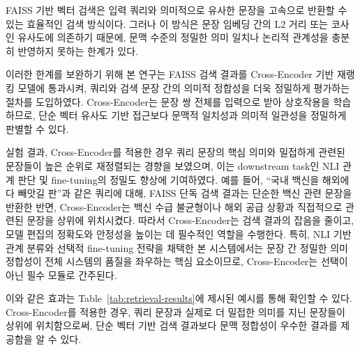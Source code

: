 \documentclass[a4paper,fleqn]{cas-sc}
\begin{document}
FAISS 기반 벡터 검색은 입력 쿼리와 의미적으로 유사한 문장을 고속으로 반환할 수 있는 효율적인 검색 방식이다. 
그러나 이 방식은 문장 임베딩 간의 L2 거리 또는 코사인 유사도에 의존하기 때문에, 문맥 수준의 정밀한 의미 일치나 논리적 관계성을 충분히 반영하지 못하는 한계가 있다.

이러한 한계를 보완하기 위해 본 연구는 FAISS 검색 결과를 Cross-Encoder 기반 재랭킹 모델에 통과시켜, 쿼리와 검색 문장 간의 의미적 정합성을 더욱 정밀하게 평가하는 절차를 도입하였다. 
Cross-Encoder는 문장 쌍 전체를 입력으로 받아 상호작용을 학습하므로, 단순 벡터 유사도 기반 접근보다 문맥적 일치성과 의미적 일관성을 정밀하게 판별할 수 있다.

실험 결과, Cross-Encoder를 적용한 경우 쿼리 문장의 핵심 의미와 밀접하게 관련된 문장들이 높은 순위로 재정렬되는 경향을 보였으며, 이는 downstream task인 NLI 관계 판단 및 fine-tuning의 정밀도 향상에 기여하였다. 예를 들어, “국내 백신을 해외에 다 빼앗길 판”과 같은 쿼리에 대해, FAISS 단독 검색 결과는 단순한 백신 관련 문장을 반환한 반면, Cross-Encoder는 백신 수급 불균형이나 해외 공급 상황과 직접적으로 관련된 문장을 상위에 위치시켰다.
따라서 Cross-Encoder는 검색 결과의 잡음을 줄이고, 모델 편집의 정확도와 안정성을 높이는 데 필수적인 역할을 수행한다. 
특히, NLI 기반 관계 분류와 선택적 fine-tuning 전략을 채택한 본 시스템에서는 문장 간 정밀한 의미 정합성이 전체 시스템의 품질을 좌우하는 핵심 요소이므로, Cross-Encoder는 선택이 아닌 필수 모듈로 간주된다.

이와 같은 효과는 Table~\ref{tab:retrieval-results}에 제시된 예시를 통해 확인할 수 있다. 
Cross-Encoder를 적용한 경우, 쿼리 문장과 실제로 더 밀접한 의미를 지닌 문장들이 상위에 위치함으로써, 단순 벡터 기반 검색 결과보다 문맥 정합성이 우수한 결과를 제공함을 알 수 있다.
\end{document}
